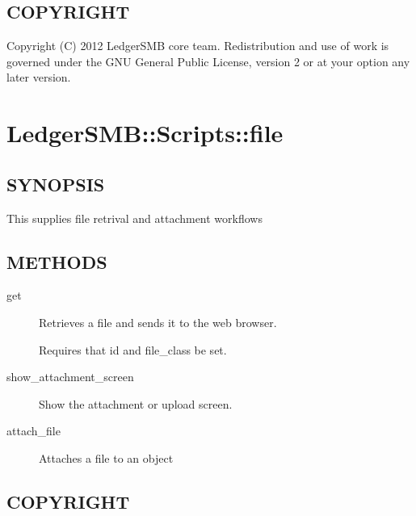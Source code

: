 \subsection*{COPYRIGHT\label{LedgerSMB::Scripts::business_unit_COPYRIGHT}}


Copyright (C) 2012 LedgerSMB core team.  Redistribution and use of work is 
governed under the GNU General Public License, version 2 or at your option any
later version.

\section{LedgerSMB::Scripts::file\label{LedgerSMB::Scripts::file}}




\subsection*{SYNOPSIS\label{LedgerSMB::Scripts::file_SYNOPSIS}}


This supplies file retrival and attachment workflows

\subsection*{METHODS\label{LedgerSMB::Scripts::file_METHODS}}
\begin{description}

\item[{get}] \mbox{}

Retrieves a file and sends it to the web browser.



Requires that id and file\_class be set.


\item[{show\_attachment\_screen}] \mbox{}

Show the attachment or upload screen.


\item[{attach\_file}] \mbox{}

Attaches a file to an object

\end{description}
\subsection*{COPYRIGHT\label{LedgerSMB::Scripts::file_COPYRIGHT}}


